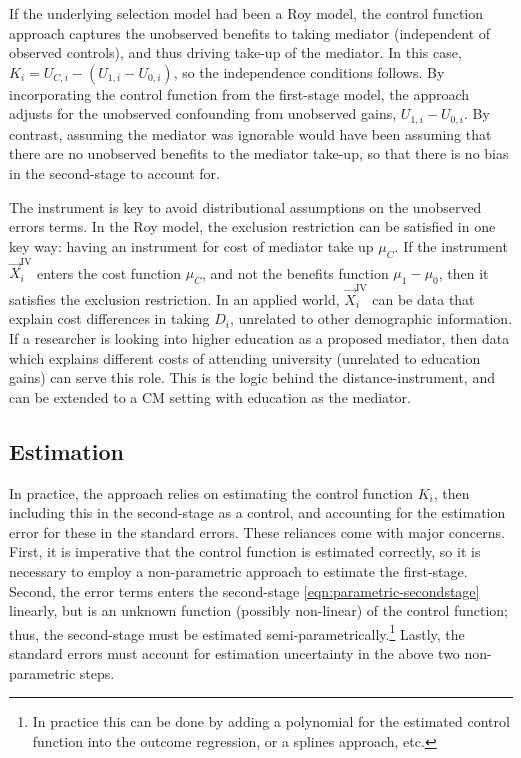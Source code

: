 If the underlying selection model had been a Roy model, the control function approach captures the unobserved benefits to taking mediator (independent of observed controls), and thus driving take-up of the mediator.
In this case, $K_i = U_{C,i} - (U_{1,i} - U_{0,i})$, so the independence conditions follows.
By incorporating the control function from the first-stage model, the approach adjusts for the unobserved confounding from unobserved gains, $U_{1,i} - U_{0,i}$.
By contrast, assuming the mediator was ignorable would have been assuming that there are no unobserved benefits to the mediator take-up, so that there is no bias in the second-stage to account for.

The instrument is key to avoid distributional assumptions on the unobserved errors terms.
In the Roy model, the exclusion restriction can be satisfied in one key way: having an instrument for cost of mediator take up $\mu_C$.
If the instrument $\vec X_i^{\text{IV}}$ enters the cost function $\mu_C$, and not the benefits function $\mu_1 - \mu_0$, then it satisfies the exclusion restriction.
In an applied world, $\vec X_i^{\text{IV}}$ can be data that explain cost differences in taking $D_i$, unrelated to other demographic information.
If a researcher is looking into higher education as a proposed mediator, then data which explains different costs of attending university (unrelated to education gains) can serve this role.
This is the logic behind the \cite{card1993using} distance-instrument, and can be extended to a CM setting with education as the mediator.


\subsection{Estimation}
In practice, the approach relies on estimating the control function $K_i$, then including this in the second-stage as a control, and accounting for the estimation error for these in the standard errors.
These reliances come with major concerns.
First, it is imperative that the control function is estimated correctly, so it is necessary to employ a non-parametric approach to estimate the first-stage.
Second, the error terms enters the second-stage \eqref{eqn:parametric-secondstage} linearly, but is an unknown function (possibly non-linear) of the control function; thus, the second-stage must be estimated semi-parametrically.\footnote{
    In practice this can be done by adding a polynomial for the estimated control function into the outcome regression, or a splines approach, etc. 
}
Lastly, the standard errors must account for estimation uncertainty in the above two non-parametric steps.

